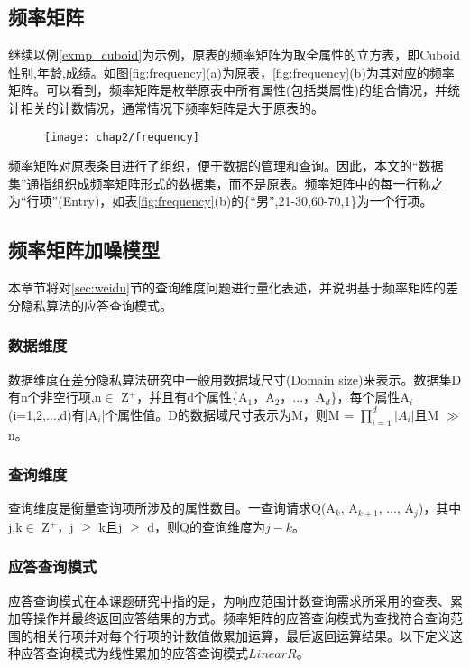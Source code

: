\subsection{频率矩阵}

继续以例\ref{exmp_cuboid}为示例，原表的频率矩阵为取全属性的立方表，即Cuboid{性别,年龄,成绩}。如图\ref{fig:frequency}(a)为原表，\ref{fig:frequency}(b)为其对应的频率矩阵。可以看到，频率矩阵是枚举原表中所有属性(包括类属性)的组合情况，并统计相关的计数情况，通常情况下频率矩阵是大于原表的。

\begin{figure}[!htp]
	\centering
	\texttt{[image: chap2/frequency]}
\end{figure}

频率矩阵对原表条目进行了组织，便于数据的管理和查询。因此，本文的“数据集”通指组织成频率矩阵形式的数据集，而不是原表。频率矩阵中的每一行称之为“行项”(Entry)，如表\ref{fig:frequency}(b)的\{“男”,21-30,60-70,1\}为一个行项。

\subsection{频率矩阵加噪模型}

本章节将对\ref{sec:weidu}节的查询维度问题进行量化表述，并说明基于频率矩阵的差分隐私算法的应答查询模式。

\subsubsection{数据维度}
数据维度在差分隐私算法研究中一般用数据域尺寸(Domain size)来表示。数据集D有n个非空行项,n$\in$ Z$^{+}$，并且有d个属性\{A$_{1}$，A$_{2}$，...，A$_{d}$\}，每个属性A$_{i}$(i=1,2,...,d)有|A$_{i}$|个属性值。D的数据域尺寸表示为M，则M = \(\prod\limits_{i = 1}^d {|A{_i} |}\)且M $\gg$ n。

\subsubsection{查询维度}
查询维度是衡量查询项所涉及的属性数目。一查询请求Q(A$_{k}$, A$_{k+1}$, ..., A$_{j}$)，其中j,k$\in$ Z$^{+}$，j $\geqslant$ k且j $\geqslant$ d，则Q的查询维度为$j-k$。

\subsubsection{应答查询模式}
\label{chap2_Linaer}
应答查询模式在本课题研究中指的是，为响应范围计数查询需求所采用的查表、累加等操作并最终返回应答结果的方式。频率矩阵的应答查询模式为查找符合查询范围的相关行项并对每个行项的计数值做累加运算，最后返回运算结果。以下定义这种应答查询模式为线性累加的应答查询模式$LinearR$。

